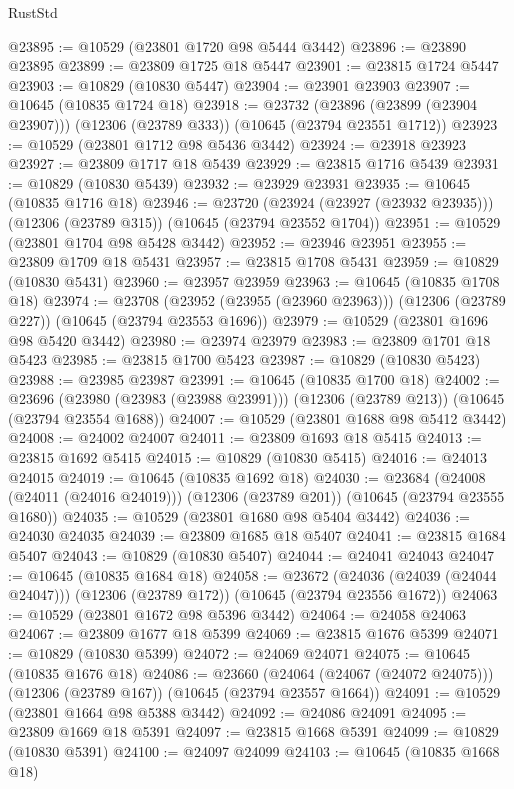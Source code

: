 \begin{lexlean}{RustStd}
\begin{coremodule}
@23895 := @10529 (@23801 @1720 @98 @5444 @3442)
@23896 := @23890 @23895
@23899 := @23809 @1725 @18 @5447
@23901 := @23815 @1724 @5447
@23903 := @10829 (@10830 @5447)
@23904 := @23901 @23903
@23907 := @10645 (@10835 @1724 @18)
@23918 := @23732
    (@23896 (@23899 (@23904 @23907)))
    (@12306 (@23789 @333))
    (@10645 (@23794 @23551 @1712))
@23923 := @10529 (@23801 @1712 @98 @5436 @3442)
@23924 := @23918 @23923
@23927 := @23809 @1717 @18 @5439
@23929 := @23815 @1716 @5439
@23931 := @10829 (@10830 @5439)
@23932 := @23929 @23931
@23935 := @10645 (@10835 @1716 @18)
@23946 := @23720
    (@23924 (@23927 (@23932 @23935)))
    (@12306 (@23789 @315))
    (@10645 (@23794 @23552 @1704))
@23951 := @10529 (@23801 @1704 @98 @5428 @3442)
@23952 := @23946 @23951
@23955 := @23809 @1709 @18 @5431
@23957 := @23815 @1708 @5431
@23959 := @10829 (@10830 @5431)
@23960 := @23957 @23959
@23963 := @10645 (@10835 @1708 @18)
@23974 := @23708
    (@23952 (@23955 (@23960 @23963)))
    (@12306 (@23789 @227))
    (@10645 (@23794 @23553 @1696))
@23979 := @10529 (@23801 @1696 @98 @5420 @3442)
@23980 := @23974 @23979
@23983 := @23809 @1701 @18 @5423
@23985 := @23815 @1700 @5423
@23987 := @10829 (@10830 @5423)
@23988 := @23985 @23987
@23991 := @10645 (@10835 @1700 @18)
@24002 := @23696
    (@23980 (@23983 (@23988 @23991)))
    (@12306 (@23789 @213))
    (@10645 (@23794 @23554 @1688))
@24007 := @10529 (@23801 @1688 @98 @5412 @3442)
@24008 := @24002 @24007
@24011 := @23809 @1693 @18 @5415
@24013 := @23815 @1692 @5415
@24015 := @10829 (@10830 @5415)
@24016 := @24013 @24015
@24019 := @10645 (@10835 @1692 @18)
@24030 := @23684
    (@24008 (@24011 (@24016 @24019)))
    (@12306 (@23789 @201))
    (@10645 (@23794 @23555 @1680))
@24035 := @10529 (@23801 @1680 @98 @5404 @3442)
@24036 := @24030 @24035
@24039 := @23809 @1685 @18 @5407
@24041 := @23815 @1684 @5407
@24043 := @10829 (@10830 @5407)
@24044 := @24041 @24043
@24047 := @10645 (@10835 @1684 @18)
@24058 := @23672
    (@24036 (@24039 (@24044 @24047)))
    (@12306 (@23789 @172))
    (@10645 (@23794 @23556 @1672))
@24063 := @10529 (@23801 @1672 @98 @5396 @3442)
@24064 := @24058 @24063
@24067 := @23809 @1677 @18 @5399
@24069 := @23815 @1676 @5399
@24071 := @10829 (@10830 @5399)
@24072 := @24069 @24071
@24075 := @10645 (@10835 @1676 @18)
@24086 := @23660
    (@24064 (@24067 (@24072 @24075)))
    (@12306 (@23789 @167))
    (@10645 (@23794 @23557 @1664))
@24091 := @10529 (@23801 @1664 @98 @5388 @3442)
@24092 := @24086 @24091
@24095 := @23809 @1669 @18 @5391
@24097 := @23815 @1668 @5391
@24099 := @10829 (@10830 @5391)
@24100 := @24097 @24099
@24103 := @10645 (@10835 @1668 @18)

\end{coremodule}
\end{lexlean}
